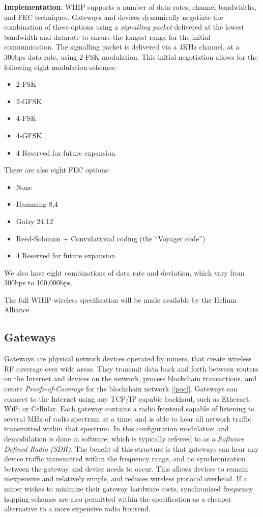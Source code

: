 \documentclass[letterpaper,11pt]{article}
\begin{document}
\textbf{Implementation}: WHIP supports a number of data rates, channel bandwidths, and FEC techniques. Gateways and devices dynamically negotiate the combination of these options using a \emph{signalling packet} delivered at the lowest bandwidth and datarate to ensure the longest range for the initial communication. The signalling packet is delivered via a 4KHz channel, at a 300bps data rate, using 2-FSK modulation. This initial negotiation allows for the following eight modulation schemes:

\begin{itemize}
    \item 2-FSK
    \item 2-GFSK
    \item 4-FSK
    \item 4-GFSK
    \item 4 Reserved for future expansion
\end{itemize}

There are also eight FEC options:

\begin{itemize}
    \item None
    \item Hamming 8,4
    \item Golay 24,12
    \item Reed-Solomon + Convulational coding (the ``Voyager code'')
    \item 4 Reserved for future expansion
\end{itemize}

We also have eight combinations of data rate and deviation, which vary from 300bps to 100,000bps.

The full WHIP wireless specification will be made available by the Helium Alliance~\cite{alliance}.

\subsection{Gateways}\label{gateways}

Gateways are physical network devices operated by miners, that create wireless RF coverage over wide areas. They transmit data back and forth between routers on the Internet and devices on the network, process blockchain transactions, and create \emph{Proofs-of-Coverage} for the blockchain network [\ref{poc}]. Gateways can connect to the Internet using any TCP/IP capable backhaul, such as Ethernet, WiFi or Cellular. Each gateway contains a radio frontend capable of listening to several MHz of radio spectrum at a time, and is able to hear all network traffic transmitted within that spectrum. In this configuration modulation and demodulation is done in software, which is typically referred to as a \emph{Software Defined Radio (SDR)}. The benefit of this structure is that gateways can hear any device traffic transmitted within the frequency range, and no synchronization between the gateway and device needs to occur. This allows devices to remain inexpensive and relatively simple, and reduces wireless protocol overhead. If a miner wishes to minimize their gateway hardware costs, synchronized frequency hopping schemes are also permitted within the specification as a cheaper alternative to a more expensive radio frontend.
\end{document}
